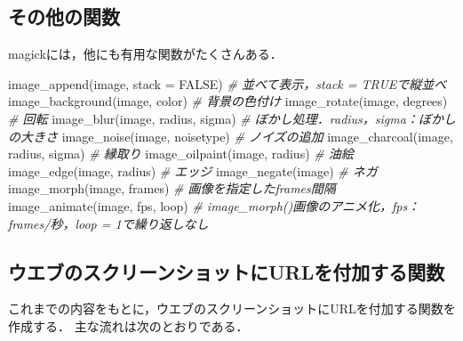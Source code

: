 \documentclass[
]{article}
\newenvironment{Shaded}{\begin{snugshade}}{\end{snugshade}}
\newcommand{\AttributeTok}[1]{\textcolor[rgb]{0.77,0.63,0.00}{#1}}
\newcommand{\CommentTok}[1]{\textcolor[rgb]{0.56,0.35,0.01}{\textit{#1}}}
\newcommand{\ConstantTok}[1]{\textcolor[rgb]{0.00,0.00,0.00}{#1}}
\newcommand{\FunctionTok}[1]{\textcolor[rgb]{0.00,0.00,0.00}{#1}}
\newcommand{\NormalTok}[1]{#1}
\begin{document}
\hypertarget{ux305dux306eux4ed6ux306eux95a2ux6570}{%
\subsection{その他の関数}\label{ux305dux306eux4ed6ux306eux95a2ux6570}}

magickには，他にも有用な関数がたくさんある．

\begin{Shaded}
\begin{Highlighting}[]
\FunctionTok{image\_append}\NormalTok{(image, }\AttributeTok{stack =} \ConstantTok{FALSE}\NormalTok{)   }\CommentTok{\# 並べて表示，stack = TRUEで縦並べ}
\FunctionTok{image\_background}\NormalTok{(image, color)       }\CommentTok{\# 背景の色付け}
\FunctionTok{image\_rotate}\NormalTok{(image, degrees)         }\CommentTok{\# 回転}
\FunctionTok{image\_blur}\NormalTok{(image, radius, sigma)     }\CommentTok{\# ぼかし処理．radius，sigma：ぼかしの大きさ}
\FunctionTok{image\_noise}\NormalTok{(image, noisetype)        }\CommentTok{\# ノイズの追加}
\FunctionTok{image\_charcoal}\NormalTok{(image, radius, sigma) }\CommentTok{\# 縁取り}
\FunctionTok{image\_oilpaint}\NormalTok{(image, radius)        }\CommentTok{\# 油絵}
\FunctionTok{image\_edge}\NormalTok{(image, radius)            }\CommentTok{\# エッジ}
\FunctionTok{image\_negate}\NormalTok{(image)                  }\CommentTok{\# ネガ}
\FunctionTok{image\_morph}\NormalTok{(image, frames)           }\CommentTok{\# 画像を指定したframes間隔}
\FunctionTok{image\_animate}\NormalTok{(image, fps, loop)      }\CommentTok{\# image\_morph()画像のアニメ化，fps：frames/秒，\textasciigrave{}loop = 1\textasciigrave{}で繰り返しなし}
\end{Highlighting}
\end{Shaded}

\hypertarget{ux30a6ux30a8ux30d6ux306eux30b9ux30afux30eaux30fcux30f3ux30b7ux30e7ux30c3ux30c8ux306burlux3092ux4ed8ux52a0ux3059ux308bux95a2ux6570}{%
\subsection{ウエブのスクリーンショットにURLを付加する関数}\label{ux30a6ux30a8ux30d6ux306eux30b9ux30afux30eaux30fcux30f3ux30b7ux30e7ux30c3ux30c8ux306burlux3092ux4ed8ux52a0ux3059ux308bux95a2ux6570}}

これまでの内容をもとに，ウエブのスクリーンショットにURLを付加する関数を作成する．
主な流れは次のとおりである．
\end{document}
